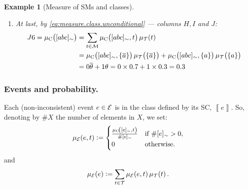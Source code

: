 \documentclass{tlp}
\newtheorem{example}{Example}
\newcommand{\eat}[1]{}
\newcommand{\at}[1]{\ensuremath{\!\del{#1}}}        %
\newcommand{\cla}[1]{\ensuremath{{\cal #1}}}        %
\newcommand{\co}[1]{\ensuremath{\overline{#1}}}     %
\newcommand{\TCHOICEset}{\ensuremath{\cla{T}}}
\newcommand{\MODELset}{\ensuremath{\cla{M}}}
\newcommand{\EVENTSset}{\ensuremath{\cla{E}}}
\newcommand{\pwT}{\ensuremath{\mu_{\TCHOICEset}}}
\newcommand{\pwt}[1]{\ensuremath{\pwT\at{#1}}}
\newcommand{\pwC}{\ensuremath{\mu_{\textrm{C}}}}
\newcommand{\pwc}[1]{\ensuremath{\pwC\at{#1}}}
\newcommand{\pwE}{\ensuremath{\mu_{\EVENTSset}}}
\newcommand{\pwe}[1]{\ensuremath{\pwE\at{#1}}}
\newcommand{\stablecore}[1]{\ensuremath{\left\llbracket #1 \right\rrbracket}}
\newcommand{\class}[1]{\ensuremath{[{#1}]_{\sim}}}
\newcommand{\LOOK}{\ensuremath{\blacksquare}}
\newcommand{\franc}[1]{{\color{green!30!black}#1}}
\begin{document}
{\begin{example}[Measure of \aclp{SM} and classes]
\begin{enumerate}
\begin{equation*}
                    \begin{aligned}
                        H6 & = \pwc{\class{abc}, \set{\co{a}}} & = 0 + 0                &  & = 0 \\
                        I6 & = \pwc{\class{abc}, \set{a}}      & = \theta + \co{\theta} &  & = 1
                    \end{aligned}
                \end{equation*}
          \item At last, by \cref{eq:measure.class.unconditional} --- columns \(H, I\) and \(J\):
                \begin{equation*}
                    \begin{split}
                        J6 = \pwc{\class{abc}} &= \sum_{t\in\MODELset} \pwc{\class{abc}, t}\pwt{t} \\
                        &=  \pwc{\class{abc}, \set{\co{a}}}\pwt{\set{\co{a}}} +
                        \pwc{\class{abc}, \set{a}}\pwt{\set{a}}  \\
                        &=  0 \co{\theta} +  1 \theta =  0 \times 0.7 +  1\times 0.3 = 0.3
                    \end{split}
                \end{equation*}
      \end{enumerate}
  \end{example}
}
%
\subsubsection*{Events and probability.}\label{sssec:propagation.event.cases}

Each (non-inconsistent) event \(e \in \EVENTSset\) is in the class defined by its \acl{SC}, \(\stablecore{e}\).  So, denoting by $\# X$ the number of elements in \(X\), we set:
\begin{equation}
  \pwe{e, t} :=
  \begin{cases}
      \frac{\pwc{\class{e}, t}}{\# \class{e}} & \text{if~}\# \class{e} > 0, \\
      0                                       & \text{otherwise}.
  \end{cases}
  \label{eq:measure.events}
\end{equation}
and
\begin{equation}
  \pwe{e} := \sum_{t\in\TCHOICEset} \pwe{e, t} \pwt{t}.
  \label{eq:measure.events.unconditional}
\end{equation}

\eat{
    \franc{\LOOK~\textbf{repeated?}~The \(\theta_{s,t}\) parameters in \cref{eq:measure.stablemodel} express the \emph{program's} lack of information about the measure assignment, when a single \acl{TC} entails more than one \acl{SM}.  In that case, how to distribute the respective measures? Our proposal to address this problem consists in assigning a parameter, \(\theta_{s,t}\), conditional on the \acl{TC}, \(t\), to each \acl{SM} \(s\).  This approach allows the expression of an unknown quantity and future estimation, given more information, \textit{e.g.} observed data.
    }
}
\end{document}
